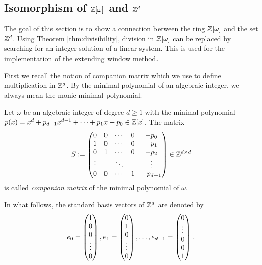 \begin{upravit}


\section{\texorpdfstring{Isomorphism of $\mathbb{Z}[\omega]$ and $\mathbb{Z}^{d}$}{Isomorphism of Z[omega] and Zd}}
The goal of this section is to show a connection between the ring $\mathbb{Z}[\omega]$ and the set $\mathbb{Z}^d$. Using Theorem \ref{thm:divisibility}, division in $\mathbb{Z}[\omega]$ can be replaced by searching for an integer solution of a linear system. This is used for the implementation of the extending window method.

First we recall the notion of companion matrix which we use to define multiplication in $\mathbb{Z}^d$. By the minimal polynomial of an algebraic integer, we always mean the monic minimal polynomial.  
\begin{defn}
Let $\omega$ be an algebraic integer of degree $d\geq 1$ with the  minimal polynomial $p(x)=x^d +p_{d-1}x^{d-1}+ \cdots + p_1 x+p_0 \in \mathbb{Z}[x]$. The matrix 
$$
S := \begin{pmatrix}
            0 & 0 & \cdots & 0 & -p_0 \\
            1 & 0 & \cdots & 0 & -p_1 \\
            0 & 1 & \cdots & 0 & -p_2 \\
            \vdots &   & \ddots & & \vdots \\
            0 & 0 & \cdots & 1 & -p_{d-1} 
            \end{pmatrix} \in \mathbb{Z}^{d\times d}
$$
is called \emph{companion matrix} of the minimal polynomial of $\omega$.
\end{defn}
In what follows, the standard basis vectors of $\mathbb{Z}^d$  are denoted by 
$$
e_0=\begin{pmatrix}
              1 \\
              0 \\
              0 \\
              \vdots \\
              0
              \end{pmatrix}, \\
e_1=\begin{pmatrix}
              0 \\
              1 \\
              0 \\
              \vdots \\
              0
              \end{pmatrix}, \dots ,\\
e_{d-1}=\begin{pmatrix}
              0 \\        
              \vdots \\
              0 \\
              0\\
              1
              \end{pmatrix}\,.             
$$


\end{upravit}
